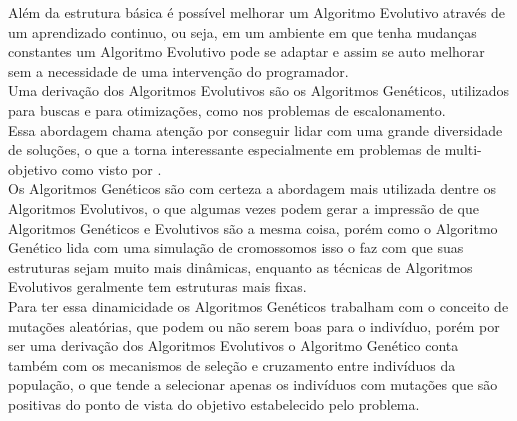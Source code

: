         Além da estrutura básica é possível melhorar um Algoritmo Evolutivo através de um aprendizado continuo, ou seja, em um ambiente em que tenha mudanças constantes um Algoritmo Evolutivo pode se adaptar e assim se auto melhorar sem a necessidade de uma intervenção do programador.\\


        Uma derivação dos Algoritmos Evolutivos são os Algoritmos Genéticos, utilizados para buscas e para otimizações, como nos problemas de escalonamento.\\
        Essa abordagem chama atenção por conseguir lidar com uma grande diversidade de soluções, o que a torna interessante especialmente em problemas de multi-objetivo como visto por \cite{Bagchi1999}.\\
        
        Os Algoritmos Genéticos são com certeza a abordagem mais utilizada dentre os Algoritmos Evolutivos, o que algumas vezes podem gerar a impressão de que Algoritmos Genéticos e Evolutivos são a mesma coisa, porém como o Algoritmo Genético lida com uma simulação de cromossomos isso o faz com que suas estruturas sejam muito mais dinâmicas, enquanto as técnicas de Algoritmos Evolutivos geralmente tem estruturas mais fixas.\\
        
        Para ter essa dinamicidade os Algoritmos Genéticos trabalham com o conceito de mutações aleatórias, que podem ou não serem boas para o indivíduo, porém por ser uma derivação dos Algoritmos Evolutivos o Algoritmo Genético conta também com os mecanismos de seleção e cruzamento entre indivíduos da população, o que tende a selecionar apenas os indivíduos com mutações que são positivas do ponto de vista do objetivo estabelecido pelo problema.\\


